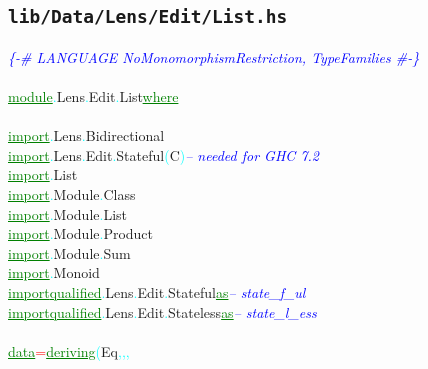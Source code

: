 \subsection{\texttt{lib/Data/Lens/Edit/List.hs}}
\label{mod:Data.Lens.Edit.List}
\textcolor{blue}{{\it{}\{-\# LANGUAGE NoMonomorphismRestriction, TypeFamilies \#-\}}}\\\\\textcolor{green}{\underline{module}}\textcolor{cyan}{.}{\rm{}Lens}\textcolor{cyan}{.}{\rm{}Edit}\textcolor{cyan}{.}{\rm{}List}\hsspace \textcolor{green}{\underline{where}}\\\\\textcolor{green}{\underline{import}}\textcolor{cyan}{.}{\rm{}Lens}\textcolor{cyan}{.}{\rm{}Bidirectional}\\\textcolor{green}{\underline{import}}\textcolor{cyan}{.}{\rm{}Lens}\textcolor{cyan}{.}{\rm{}Edit}\textcolor{cyan}{.}{\rm{}Stateful}\hsspace \textcolor{cyan}{(}{\rm{}C}\textcolor{cyan}{)}\hsspace \textcolor{blue}{{\it{}-- needed for GHC 7.2}}\\\textcolor{green}{\underline{import}}\textcolor{cyan}{.}{\rm{}List}\\\textcolor{green}{\underline{import}}\textcolor{cyan}{.}{\rm{}Module}\textcolor{cyan}{.}{\rm{}Class}\\\textcolor{green}{\underline{import}}\textcolor{cyan}{.}{\rm{}Module}\textcolor{cyan}{.}{\rm{}List}\\\textcolor{green}{\underline{import}}\textcolor{cyan}{.}{\rm{}Module}\textcolor{cyan}{.}{\rm{}Product}\\\textcolor{green}{\underline{import}}\textcolor{cyan}{.}{\rm{}Module}\textcolor{cyan}{.}{\rm{}Sum}\\\textcolor{green}{\underline{import}}\textcolor{cyan}{.}{\rm{}Monoid}\\\textcolor{green}{\underline{import}}\hsspace \textcolor{green}{\underline{qualified}}\textcolor{cyan}{.}{\rm{}Lens}\textcolor{cyan}{.}{\rm{}Edit}\textcolor{cyan}{.}{\rm{}Stateful}\hsspace \hsspace \textcolor{green}{\underline{as}}\hsspace \textcolor{blue}{{\it{}-- state\_f\_ul}}\\\textcolor{green}{\underline{import}}\hsspace \textcolor{green}{\underline{qualified}}\textcolor{cyan}{.}{\rm{}Lens}\textcolor{cyan}{.}{\rm{}Edit}\textcolor{cyan}{.}{\rm{}Stateless}\hsspace \textcolor{green}{\underline{as}}\hsspace \textcolor{blue}{{\it{}-- state\_l\_ess}}\\\\\textcolor{green}{\underline{data}}\hsspace \textcolor{red}{=}\hsspace \textcolor{green}{\underline{deriving}}\hsspace \textcolor{cyan}{(}{\rm{}Eq}\textcolor{cyan}{,}\textcolor{cyan}{,}\textcolor{cyan}{,}\hsspace 